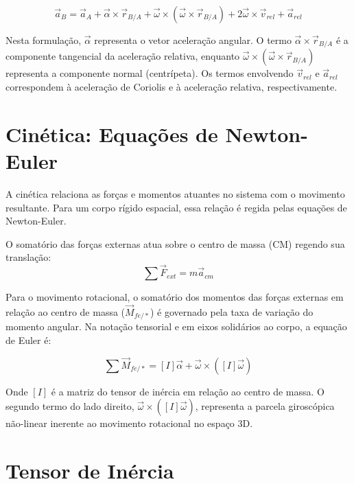 \begin{equation}
  \vec{a}_B = \vec{a}_A + \vec{\alpha} \times \vec{r}_{B/A} + \vec{\omega} \times (\vec{\omega} \times \vec{r}_{B/A}) + 2\vec{\omega} \times \vec{v}_{rel} + \vec{a}_{rel}
  \label{eq:aceleracao}
\end{equation}

Nesta formulação, $\vec{\alpha}$ representa o vetor aceleração angular. O termo $\vec{\alpha} \times \vec{r}_{B/A}$ é a componente tangencial da aceleração relativa, enquanto $\vec{\omega} \times (\vec{\omega} \times \vec{r}_{B/A})$ representa a componente normal (centrípeta). Os termos envolvendo $\vec{v}_{rel}$ e $\vec{a}_{rel}$ correspondem à aceleração de Coriolis e à aceleração relativa, respectivamente.

\section{\textbf{Cinética: Equações de Newton-Euler}}
\label{sec:cinetica}

A cinética relaciona as forças e momentos atuantes no sistema com o movimento resultante. Para um corpo rígido espacial, essa relação é regida pelas equações de Newton-Euler. 

O somatório das forças externas atua sobre o centro de massa (CM) regendo sua translação:
\begin{equation}
  \sum \vec{F}_{ext} = m\vec{a}_{cm}
  \label{eq:newton}
\end{equation}

Para o movimento rotacional, o somatório dos momentos das forças externas em relação ao centro de massa ($\vec{M}_{fe/*}$) é governado pela taxa de variação do momento angular. Na notação tensorial e em eixos solidários ao corpo, a equação de Euler é:

\begin{equation}
  \sum \vec{M}_{fe/*} = [I]\vec{\alpha} + \vec{\omega} \times ([I]\vec{\omega})
  \label{eq:euler_momentos}
\end{equation}

Onde $[I]$ é a matriz do tensor de inércia em relação ao centro de massa. O segundo termo do lado direito, $\vec{\omega} \times ([I]\vec{\omega})$, representa a parcela giroscópica não-linear inerente ao movimento rotacional no espaço 3D.
\section{\textbf{Tensor de Inércia}}
\label{sec:tensor}

